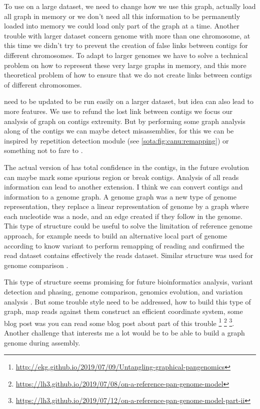 \documentclass[main.tex]{subfiles}
\begin{document}
To use \knot on a large dataset, we need to change how we use this graph, actually \knot load all graph in memory or we don't need all this information to be permanently loaded into memory we could load only part of the graph at a time. Another trouble with larger dataset concern genome with more than one chromosome, at this time we didn't try to prevent the creation of false links between contigs for different chromosomes. To adapt \knot to larger genomes we have to solve a technical problem on how to represent these very large graphs in memory, and this more theoretical problem of how to ensure that we do not create links between contigs of different chromosomes.

\knot need to be updated to be run easily on a larger dataset, but \knot idea can also lead to more features. We use \knot \OLC to refund the lost link between contigs we focus our analysis of graph on contigs extremity. But by performing some graph analysis along of the contigs we can maybe detect misassemblies, for this we can be inspired by \canu repetition detection module (see \ref{sota:fig:canu:remapping}) or something not to fare to \cite{jackman2018tigmint}.

The actual version of \knot has total confidence in the contigs, in the future evolution can maybe mark some spurious region or break contigs. Analysis of all reads information can lead to another extension. I think we can convert contigs and \knot \OLC information to a genome graph. A genome graph was a new type of genome representation, they replace a linear representation of genome by a graph where each nucleotide was a node, and an edge created if they follow in the genome. This type of structure could be useful to solve the limitation of reference genome approach, for example  \cite{whatshap} needs to build an alternative local part of genome according to know variant to perform remapping of reading and confirmed the read dataset contains effectively the reads dataset. Similar structure was used for genome comparison  \cite{cactus_graph}.

This type of structure seems promising for future bioinformatics analysis, variant detection and phasing, genome comparison,  genomics evolution, and variation analysis \cite{goodbye_ref_hello_graphs}. But some trouble style need to be addressed, how to build this type of graph, map reads against them construct an efficient coordinate system, some blog post was you can read some blog post about part of this trouble \footnote{\url{http://ekg.github.io/2019/07/09/Untangling-graphical-pangenomics}} \footnote{\url{https://lh3.github.io/2019/07/08/on-a-reference-pan-genome-model}} \footnote{\url{https://lh3.github.io/2019/07/12/on-a-reference-pan-genome-model-part-ii}}. Another challenge that interests me a lot would be to be able to build a graph genome during assembly.
\end{document}
